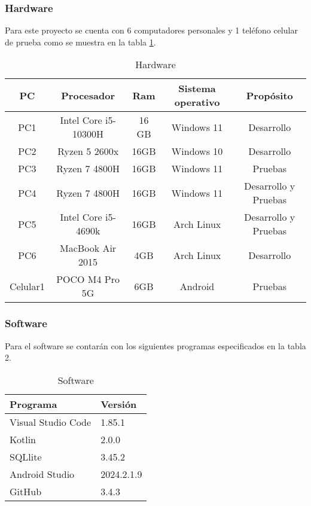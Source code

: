\subsubsection{Hardware}
Para este proyecto se cuenta con 6 computadores personales y 1 teléfono celular de prueba como se muestra en la tabla 
\ref{table:1}.
\begin{table}[H]
    \centering
    \caption{Hardware}
	\vspace{0.2cm}
    \begin{tabular}{|c|c|c|c|c|} \hline
        \textbf{PC} & \textbf{Procesador} & \textbf{Ram} & \textbf{Sistema operativo} & \textbf{Propósito}  \\ \hline
         PC1 & Intel Core i5-10300H       & 16 GB        & Windows 11 & Desarrollo \\\hline
         PC2 & Ryzen 5 2600x       &  16GB      & Windows 10 & Desarrollo\\\hline
         PC3 & Ryzen 7 4800H       &  16GB      & Windows 11  & Pruebas\\\hline
         PC4 & Ryzen 7 4800H       &  16GB      & Windows 11 & Desarrollo y Pruebas\\\hline
		 PC5 & Intel Core i5-4690k &  16GB		& Arch Linux & Desarrollo y Pruebas\\\hline
		 PC6 & MacBook Air 2015	   &  4GB		& Arch Linux & Desarrollo\\\hline
		 Celular1 &	POCO M4 Pro 5G &  6GB		& Android	 & Pruebas\\\hline
    \end{tabular}
    
    \label{table:1}
\end{table}
\newpage
\subsubsection{Software}
Para el software se contarán con los siguientes programas especificados en la tabla 2.
\begin{table}[H]
    \centering
    \caption{Software}
	\vspace{0.2cm}
    \begin{tabular}{|l|l|} \hline
        \textbf{Programa} & \textbf{Versión} \\ \hline
         Visual Studio Code & 1.85.1\\\hline
         Kotlin & 2.0.0 \\\hline
         SQLlite &  3.45.2\\\hline
         Android Studio &  2024.2.1.9\\\hline
         GitHub &  3.4.3 \\\hline
    \end{tabular}
    \label{table:2}
\end{table}

